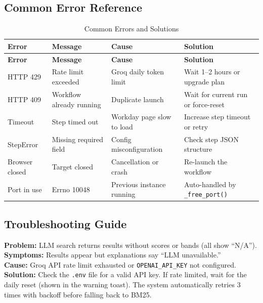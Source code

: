 \documentclass[12pt,a4paper]{article}
\begin{document}
\subsection{Common Error Reference}
\label{subsec:error-reference}

\begin{longtable}{p{2.5cm} p{4cm} p{3cm} p{4cm}}
\caption{Common Errors and Solutions} \label{tab:errors} \\
\toprule
\textbf{Error} & \textbf{Message} & \textbf{Cause} & \textbf{Solution} \\
\midrule
\endfirsthead
\toprule
\textbf{Error} & \textbf{Message} & \textbf{Cause} & \textbf{Solution} \\
\midrule
\endhead
HTTP 429 & Rate limit exceeded & Groq daily token limit & Wait 1--2 hours or upgrade plan \\
\midrule
HTTP 409 & Workflow already running & Duplicate launch & Wait for current run or force-reset \\
\midrule
Timeout & Step timed out & Workday page slow to load & Increase step timeout or retry \\
\midrule
StepError & Missing required field & Config misconfiguration & Check step JSON structure \\
\midrule
Browser closed & Target closed & Cancellation or crash & Re-launch the workflow \\
\midrule
Port in use & Errno 10048 & Previous instance running & Auto-handled by \texttt{\_free\_port()} \\
\bottomrule
\end{longtable}

\subsection{Troubleshooting Guide}
\label{subsec:troubleshooting-guide}

\textbf{Problem:} LLM search returns results without scores or bands (all show ``N/A'').\\
\textbf{Symptoms:} Results appear but explanations say ``LLM unavailable.''\\
\textbf{Cause:} Groq API rate limit exhausted or \texttt{OPENAI\_API\_KEY} not configured.\\
\textbf{Solution:} Check the \texttt{.env} file for a valid API key. If rate limited, wait for the daily reset (shown in the warning toast). The system automatically retries 3 times with backoff before falling back to BM25.
\end{document}
